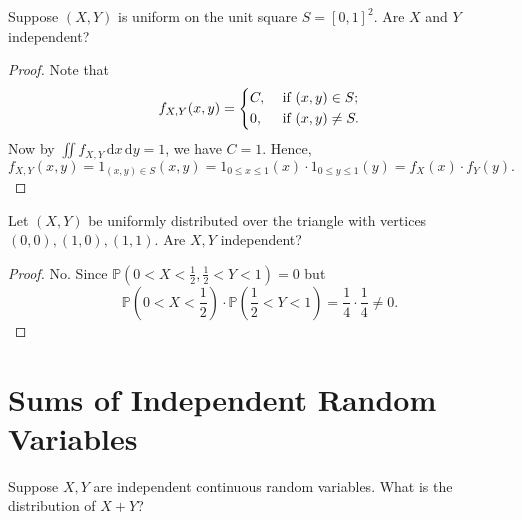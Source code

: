 \begin{eg}
    Suppose \((X, Y)\) is uniform on the unit square \(S = [0, 1]^2\). Are \(X\) and \(Y\) independent?    
\end{eg}

\begin{proof}
    Note that
    \[
        f_{X, Y}(x, y) = \begin{dcases}
            C, &\text{ if } (x, y) \in S  ;\\
            0, &\text{ if } (x, y) \neq S.
        \end{dcases}
    \]
    Now by \(\iint f_{X, Y} \, \mathrm{d} x \, \mathrm{d} y = 1\), we have \(C = 1\). Hence,
    \[
        f_{X, Y}(x,y) = 1_{(x, y) \in S}(x,y) = 1_{0 \le x \le 1} (x) \cdot 1_{0 \le y \le 1}(y) = f_X(x) \cdot f_Y(y).
    \]   
\end{proof}


\begin{eg}
    Let \((X, Y)\) be uniformly distributed over the triangle with vertices \((0, 0), (1, 0), (1, 1)\). Are \(X, Y\) independent?   
\end{eg}

\begin{proof}
    No. Since \(\mathbb{P} (0 < X < \frac{1}{2}, \frac{1}{2} < Y < 1) = 0\) but 
    \[
        \mathbb{P} (0 < X < \frac{1}{2}) \cdot \mathbb{P} (\frac{1}{2} < Y < 1) = \frac{1}{4} \cdot \frac{1}{4} \neq 0.
    \] 
\end{proof}

\section{Sums of Independent Random Variables}
\begin{question}
    Suppose \(X, Y\) are independent continuous random variables. What is the distribution of \(X + Y\)?  
\end{question}

